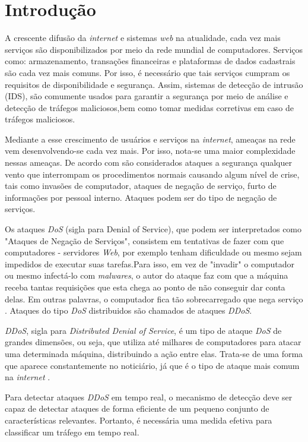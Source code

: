 \chapter[Introdução]{Introdução}
\label{introducao}
A crescente difusão da \textit{internet} e sistemas \textit{web} na
atualidade, cada  vez mais serviços são disponibilizados por meio da rede mundial de computadores. Serviços como: armazenamento, transações financeiras e plataformas de dados cadastrais são cada vez mais comuns. Por isso, é necessário que tais serviços cumpram os requisitos de disponibilidade e segurança. Assim, sistemas de detecção de intrusão (IDS), são comumente usados para garantir a segurança por meio de análise e detecção de tráfegos maliciosos,bem como tomar medidas corretivas em caso de tráfegos maliciosos.

Mediante a esse crescimento de usuários e serviços na \textit{internet}, ameaças na rede vem desenvolvendo-se cada vez mais. Por isso, nota-se uma maior complexidade nessas ameaças. De acordo com  são considerados ataques a segurança qualquer vento que interrompam os procedimentos normais causando algum nível de crise, tais como invasões de computador, ataques de negação de serviço, furto de informações por pessoal interno. Ataques podem ser do tipo de negação de serviços.

Os ataques \textit{DoS} (sigla para Denial of Service), que podem ser interpretados como "Ataques de Negação de Serviços", consistem em tentativas de fazer com que computadores - servidores \textit{Web}, por exemplo tenham dificuldade ou mesmo sejam impedidos de executar suas tarefas.Para isso, em vez de "invadir" o computador ou mesmo infectá-lo com \textit{malwares}, o autor do ataque faz com que a máquina receba tantas requisições que esta chega ao ponto de não conseguir dar conta delas. Em outras palavras, o computador fica tão sobrecarregado que nega serviço \cite{HOQUE201748}. Ataques do tipo \textit{DoS} distribuidos são chamados de ataques \textit{DDoS}.

 \textit{DDoS}, sigla para \textit{Distributed Denial of Service}, é um tipo de ataque  \textit{DoS} de grandes dimensões, ou seja, que utiliza até milhares de computadores para atacar uma determinada máquina, distribuindo a ação entre elas. Trata-se de uma forma que aparece constantemente no noticiário, já que é o tipo de ataque mais comum na \textit{internet} \cite{alecrim2008ataques}.
	
Para detectar ataques  \textit{DDoS} em tempo real, o mecanismo de detecção deve ser capaz de detectar ataques de forma eficiente de um pequeno conjunto de características relevantes.
Portanto, é necessária uma medida efetiva  para classificar um  tráfego em tempo real. 

